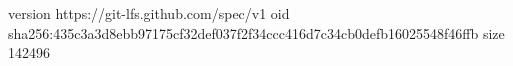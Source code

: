 version https://git-lfs.github.com/spec/v1
oid sha256:435c3a3d8ebb97175cf32def037f2f34ccc416d7c34cb0defb16025548f46ffb
size 142496
